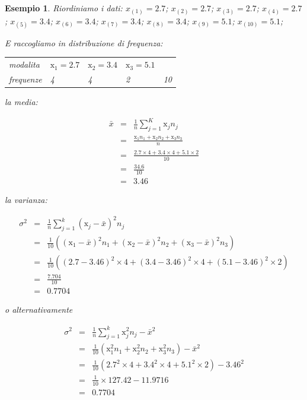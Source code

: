 \documentclass[
  11pt,
]{book}
\theoremstyle{mytheoremstyle}
\theoremstyle{mydefstyle}
\newtheorem{example}{{Esempio}}[section]
\begin{document}
\begin{example}
Riordiniamo i dati:
\(x_{(1)}=2.7\); \(x_{(2)}=2.7\); \(x_{(3)}=2.7\); \(x_{(4)}=2.7\); \(x_{(5)}=3.4\); \(x_{(6)}=3.4\); \(x_{(7)}=3.4\); \(x_{(8)}=3.4\); \(x_{(9)}=5.1\); \(x_{(10)}=5.1\);

E raccogliamo in distribuzione di frequenza:

\begin{tabular}{llll|>{}l}
\toprule
modalita & $\mathrm{x}_1=2.7$ & $\mathrm{x}_2=3.4$ & $\mathrm{x}_3=5.1$ & \\
frequenze & 4 & 4 & 2 & 10\\
\bottomrule
\end{tabular}

la media:

\begin{eqnarray*}
  \bar x &=&\frac 1 n \sum_{j=1}^K\mathrm{x}_j n_j \\
  &=& \frac{\mathrm{x}_1 n_1+\mathrm{x}_2 n_2+\mathrm{x}_3 n_3} n \\
         &=& \frac{2.7\times 4+3.4\times 4+5.1\times 2} {10} \\
         &=& \frac{34.6} {10} \\
         &=& 3.46
\end{eqnarray*}

la varianza:

\begin{eqnarray*}
  \sigma^2 &=& \frac 1 n\sum_{j=1}^k(\mathrm{x}_j-\bar x)^2n_j\\
  &=&\frac 1 {10}\left((\mathrm{x}_1 -\bar x)^2n_1+(\mathrm{x}_2-\bar x)^2 n_2+(\mathrm{x}_3-\bar x)^2 n_3\right)  \\
         &=& \frac1 {10}\left((2.7-3.46)^2\times 4+(3.4-3.46)^2\times 4+(5.1-3.46)^2\times 2\right)  \\
         &=& \frac{7.704} {10}\\
         &=& 0.7704
\end{eqnarray*}

o alternativamente

\begin{eqnarray*}
  \sigma^2 &=& \frac 1 n\sum_{j=1}^k\mathrm{x}_j^2n_j-\bar x^2\\
  &=&\frac 1 {10} (\mathrm{x}_1^2n_1+\mathrm{x}_2^2n_2+\mathrm{x}_3^2n_3)-\bar x^2\\
         &=& \frac 1 {10} (2.7^2\times4+3.4^2\times4+5.1^2\times2)-3.46^2\\
         &=& \frac 1 {10}\times 127.42-11.9716\\
         &=& 0.7704
\end{eqnarray*}
\end{example}
\end{document}
